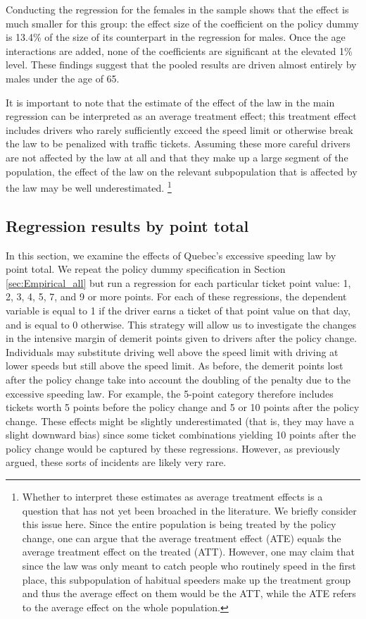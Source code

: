 Conducting the regression for the females in the sample shows that 
the effect is much smaller for this group: 
the effect size of the coefficient on the policy dummy is 13.4\% of the size of its counterpart 
in the regression for males. 
Once the age interactions are added, none of the coefficients are significant at the elevated 1\% level. 
These findings suggest that the pooled results are driven almost entirely by males under the age of 65.

It is important to note that the estimate of the effect of the law in the main regression 
can be interpreted as an average treatment effect; 
this treatment effect includes drivers who rarely sufficiently exceed the speed limit 
or otherwise break the law to be penalized with traffic tickets. 
Assuming these more careful drivers are not affected by the law at all 
and that they make up a large segment of the population, 
the effect of the law on the relevant subpopulation that is affected by the law 
may be well underestimated.%
\footnote{%
Whether to interpret these estimates as average treatment effects 
is a question that has not yet been broached in the literature. 
We briefly consider this issue here. 
Since the entire population is being treated by the policy change, 
one can argue that the average treatment effect (ATE) equals 
the average treatment effect on the treated (ATT). 
However, one may claim that since the law was only meant to catch people 
who routinely speed in the first place, 
this subpopulation of habitual speeders make up the treatment group 
and thus the average effect on them would be the ATT, 
while the ATE refers to the average effect on the whole population.
}
%


\subsection{Regression results by point total}
\label{sec:Empirical_by_pts}

In this section, we examine the effects of Quebec’s excessive speeding law by point total. 
We repeat the policy dummy specification in 
Section \ref{sec:Empirical_all} 
but run a regression for each particular ticket point value: 1, 2, 3, 4, 5, 7, and 9 or more points. 
For each of these regressions, the dependent variable is equal to 1 
if the driver earns a ticket of that point value on that day, and is equal to 0 otherwise. 
This strategy will allow us to investigate the changes in the intensive margin of 
demerit points given to drivers after the policy change. 
Individuals may substitute driving well above the speed limit with driving at lower speeds 
but still above the speed limit. 
As before, the demerit points lost after the policy change take into account 
the doubling of the penalty due to the excessive speeding law. 
For example, the 5-point category therefore includes tickets 
worth 5 points before the policy change and 5 or 10 points after the policy change. 
These effects might be slightly underestimated (that is, they may have a slight downward bias) 
since some ticket combinations yielding 10 points after the policy change 
would be captured by these regressions. 
However, as previously argued, these sorts of incidents are likely very rare. %


